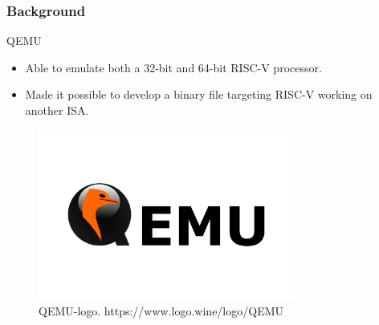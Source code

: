 \begin{frame}[hoved]
	\frametitle{Background}
	\begin{minipage}[t]{0.45\textwidth}
		{\large QEMU}
		\begin{itemize}
			\item Able to emulate both a 32-bit and 64-bit RISC-V processor.
			\item Made it possible to develop a binary file targeting RISC-V working on
			      another ISA.
		\end{itemize}
		\vspace{0.5em}
	\end{minipage}
	\hfill
	\begin{minipage}[t]{0.45\textwidth}
		\begin{figure}
			\begin{center}
				\includegraphics[width=0.75\textwidth]{figures/QEMU-logo.png}
			\end{center}
			\caption{QEMU-logo.
				\tiny https://www.logo.wine/logo/QEMU}\label{fig:qemu-logo}
		\end{figure}
	\end{minipage}
\end{frame}

